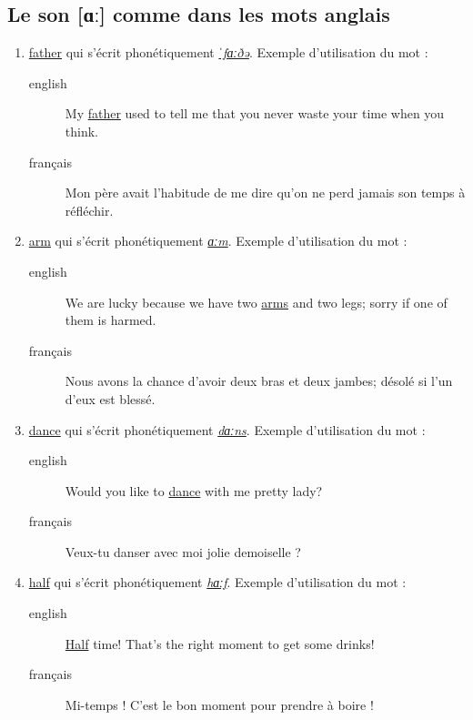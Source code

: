 \documentclass[12pt,a4paper]{book}
\begin{document}
\subsection{Le son [ɑː] comme dans les mots anglais}
\label{sec:org73a1177}
\begin{enumerate}
\item \href{http://www.wordreference.com/enfr/father}{father} qui s'écrit phonétiquement \href{https://en.oxforddictionaries.com/definition/father}{\emph{ˈfɑːðə}}. Exemple d'utilisation du mot :
\begin{description}
\item[{english}] \textenglish{My \href{https://youtu.be/MZDAUbeSwNY}{father} used to tell me that you never waste your
time when you think.}
\item[{français}] Mon père avait l'habitude de me dire qu'on ne perd
jamais son temps à réfléchir.
\end{description}
\item \href{http://www.wordreference.com/enfr/arm}{arm} qui s'écrit phonétiquement \href{https://en.oxforddictionaries.com/definition/arm}{\emph{ɑːm}}. Exemple d'utilisation du mot :
\begin{description}
\item[{english}] \textenglish{We are lucky because we have two \href{https://youtu.be/tlhQghmuMf8}{arms} and two legs;
sorry if one of them is harmed.}
\item[{français}] Nous avons la chance d'avoir deux bras et deux
jambes; désolé si l'un d'eux est blessé.
\end{description}
\item \href{http://www.wordreference.com/enfr/dance}{dance} qui s'écrit phonétiquement \href{https://en.oxforddictionaries.com/definition/dance}{\emph{dɑːns}}. Exemple d'utilisation du mot :
\begin{description}
\item[{english}] \textenglish{Would you like to \href{https://youtu.be/aagbeWUDe7w}{dance} with me pretty lady?}
\item[{français}] Veux-tu danser avec moi jolie demoiselle ?
\end{description}
\item \href{http://www.wordreference.com/enfr/half}{half} qui s'écrit phonétiquement \href{https://en.oxforddictionaries.com/definition/half}{\emph{hɑːf}}. Exemple d'utilisation du mot :
\begin{description}
\item[{english}] \textenglish{\href{https://youtu.be/XWamnSNgiCM}{Half} time! That's the right moment to get some drinks!}
\item[{français}] Mi-temps ! C'est le bon moment pour prendre à boire !
\end{description}
\end{enumerate}
\end{document}
